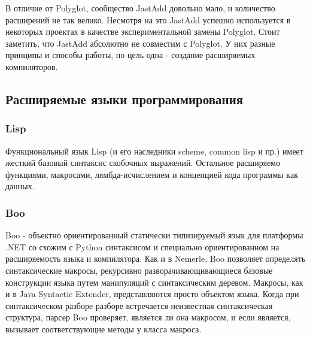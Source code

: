 \documentclass[a4paper,12pt]{article}
\begin{document}
В отличие от Polyglot, сообщество JastAdd довольно мало, и количество
расширений не так велико. Несмотря на это JastAdd успешно используется в
некоторых проектах в качестве экспериментальной замены Polyglot. Стоит
заметить, что JastAdd абсолютно не совместим с Polyglot. У них разные принципы
и способы работы, но цель одна - создание расширяемых компиляторов.

\subsection{Расширяемые языки программирования}

\subsubsection{Lisp}
Функциональный язык Lisp (и его наследники scheme, common lisp и пр.) имеет
жесткий базовый синтаксис скобочных выражений. Остальное расширяемо функциями,
макросами, лямбда-исчислением и концепцией кода программы как данных.

\subsubsection{Boo}
Boo - объектно ориентированный статически типизируемый язык для платформы .NET
со схожим с Python синтаксисом и специально ориентированном на расширяемость
языка и компилятора. Как и в Nemerle, Boo позволяет определять синтаксические
макросы, рекурсивно разворачивающивающиеся базовые конструкции языка путем
манипуляций с синтаксическим деревом. Макросы, как и в Java Syntactic Extender,
представляются просто объектом языка. Когда при синтаксическом разборе разборе
встречается неизвестная синтаксическая структура, парсер Boo проверяет,
является ли она макросом, и если является, вызывает соответствующие методы у
класса макроса.
\end{document}
